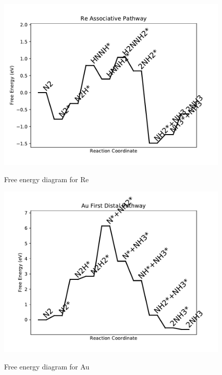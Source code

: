 \documentclass{article}
\begin{document}
\begin{figure}
\includegraphics[width=1\linewidth]{data/plots/Re_associative.pdf}
\label{fig:Re_associative}
\caption{Free energy diagram for Re}
\end{figure}

\begin{figure}
\includegraphics[width=1\linewidth]{data/plots/Au_distal_1.pdf}
\label{fig:Au_distal_1}
\caption{Free energy diagram for Au}
\end{figure}
\end{document}
